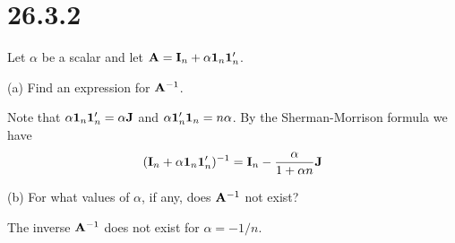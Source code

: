 \section*{26.3.2}
Let $\alpha$ be a scalar and let ${\bf A}={\bf I}_n+\alpha{\bf 1}_n{\bf 1}'_n$.

\bigskip
\noindent
(a) Find an expression for ${\bf A}^{-1}$.

\bigskip
\noindent
Note that $\alpha{\bf 1}_n{\bf 1}'_n=\alpha{\bf J}$ and $\alpha{\bf 1}'_n{\bf 1}_n=n\alpha$.
By the Sherman-Morrison formula we have
$$({\bf I}_n+\alpha{\bf 1}_n{\bf 1}'_n)^{-1}
={\bf I}_n-{\alpha\over1+\alpha n}{\bf J}
$$

\bigskip
\noindent
(b) For what values of $\alpha$, if any, does ${\bf A}^{-1}$ not exist?

\bigskip
\noindent
The inverse ${\bf A}^{-1}$ does not exist for $\alpha=-1/n$.

